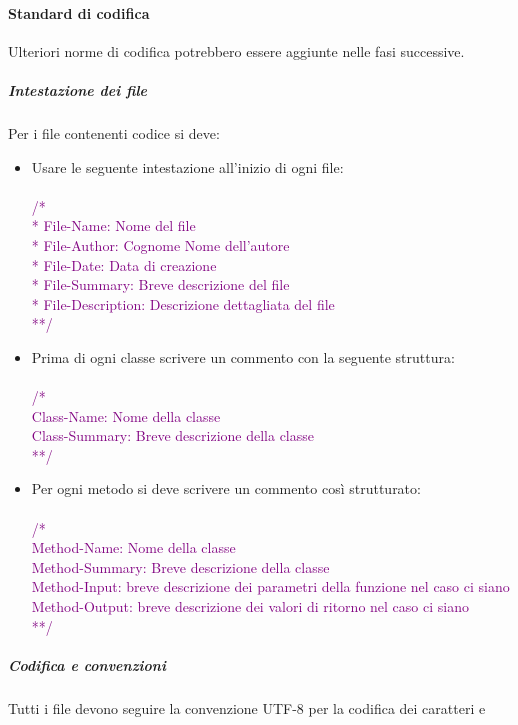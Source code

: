 \documentclass[../NormeDiProgetto.tex]{subfiles}
\begin{document}
			\paragraph{Standard di codifica\\}
				Ulteriori norme di codifica potrebbero essere aggiunte nelle fasi successive.
				\subparagraph{Intestazione dei file\\}
					Per i file contenenti codice si deve:
					\begin{itemize}
						\item Usare le seguente intestazione all'inizio di ogni file:\\
						\textcolor{purple}{	\\/*\\
							* File-Name: Nome del file\\
							* File-Author: Cognome Nome dell'autore\\
							* File-Date: Data di creazione\\
							* File-Summary: Breve descrizione del file\\
							* File-Description: Descrizione dettagliata del file\\
							**/}
						\item Prima di ogni classe scrivere un commento con la seguente struttura:\\
						\textcolor{purple}{	\\/*\\
							Class-Name: Nome della classe\\
							Class-Summary: Breve descrizione della classe\\
							**/}
						\item Per ogni metodo si deve scrivere un commento così strutturato:\\
						\textcolor{purple}{	\\/*\\
							Method-Name: Nome della classe\\
							Method-Summary: Breve descrizione della classe\\
							Method-Input: breve descrizione dei parametri della funzione nel caso
							ci siano\\
							Method-Output: breve descrizione dei valori di ritorno nel caso ci siano\\ 
							**/ }
					\end{itemize}
				\subparagraph{Codifica e convenzioni\\}
					Tutti i file devono seguire la convenzione UTF-8 per la codifica dei caratteri e
\end{document}
